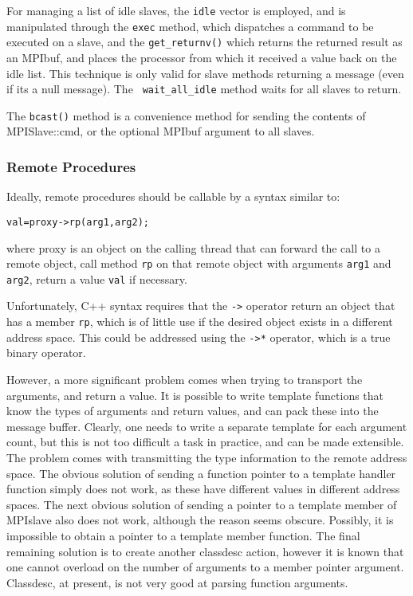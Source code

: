 For managing a list of idle slaves, the {\tt idle} vector
is employed, and is manipulated through the {\tt exec}
method, which dispatches a command to be executed on a slave, and the
{\tt get\_returnv()} which returns the returned
result as an MPIbuf, and places the processor from which it received a
value back on the idle list. This technique is only valid for slave
methods returning a message (even if its a null message). The {\tt
wait\_all\_idle} method waits for all slaves to
return.

The {\tt bcast()} method is a convenience method for sending the
contents of MPISlave::cmd, or the optional MPIbuf argument to all
slaves. 

\subsubsection{Remote Procedures}\label{slave-method}

Ideally, remote procedures should be callable by a syntax similar to:
\begin{verbatim}
val=proxy->rp(arg1,arg2);
\end{verbatim}
where proxy is an object on the calling thread that can forward the
call to a remote object, call method {\tt rp} on that remote object
with arguments {\tt arg1} and {\tt arg2}, return a value {\tt val} if
necessary. 

Unfortunately, C++ syntax requires that the \verb+->+ operator
return an object that has a member {\tt rp}, which is of little use if
the desired object exists in a different address space. This could be
addressed using the \verb+->*+ operator, which is a true binary
operator. 

However, a more significant problem comes when trying to transport the
arguments, and return a value. It is possible to write template
functions that know the types of arguments and return values, and can
pack these into the message buffer. Clearly, one needs to write a
separate template for each argument count, but this is not too
difficult a task in practice, and can be made extensible. The problem
comes with transmitting the type information to the remote address
space. The obvious solution of sending a function pointer to a
template handler function simply does not work, as these have
different values in different address spaces. The next obvious
solution of sending a pointer to a template member of MPIslave also
does not work, although the reason seems obscure. Possibly, it is
impossible to obtain a pointer to a template member function.
The final remaining solution is to create another classdesc action,
however it is known that one cannot overload on the number of
arguments to a member pointer argument. Classdesc, at present, is not
very good at parsing function arguments.

